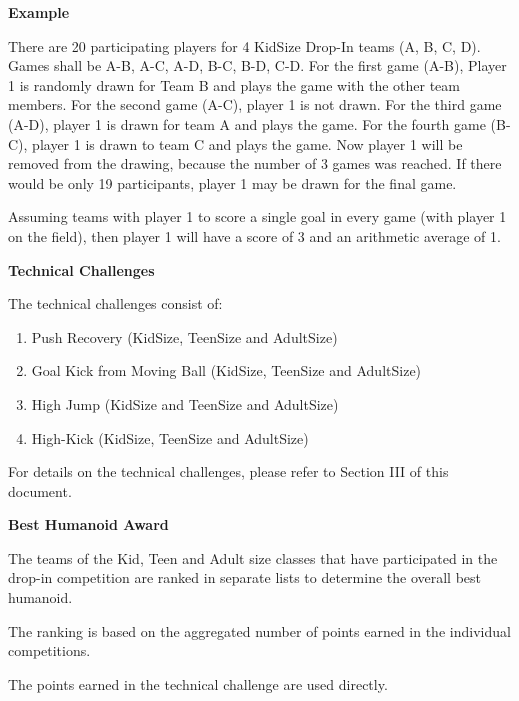 \bigskip 
 
{\bfseries Example}
 
There are 20 participating players for 4 KidSize Drop-In teams (A, B, C, D). Games shall be A-B, A-C, A-D, B-C, B-D, C-D. For the first game (A-B), Player 1 is randomly drawn for Team B and plays the game with the other team members. For the second game (A-C), player 1 is not drawn. For the third game (A-D), player 1 is drawn for team A and plays the game. For the fourth game (B-C), player 1 is drawn to team C and plays the game. Now player 1 will be removed from the drawing, because the number of 3 games was reached. If there would be only 19 participants, player 1 may be drawn for the final game.

Assuming teams with player 1 to score a single goal in every game (with player 1 on the field), then player 1 will have a score of 3 and an arithmetic average of 1.

\bigskip

{\bfseries Technical Challenges}

\headlinebox

The technical challenges consist of:

\begin{enumerate}
\item Push Recovery (KidSize, TeenSize and AdultSize)
\item Goal Kick from Moving Ball (KidSize, TeenSize and AdultSize)
\item High Jump (KidSize and TeenSize and AdultSize)
\item High-Kick (KidSize, TeenSize and AdultSize)
\end{enumerate}

For details on the technical challenges, please refer to Section III of this document.

\bigskip

\newpage
{\bfseries Best Humanoid Award}

\headlinebox
 
The teams of the Kid, Teen and Adult size classes that have participated in the drop-in competition are ranked in separate lists to determine the overall best humanoid.

The ranking is based on the aggregated number of points earned in the individual competitions.

\bigskip

The points earned in the technical challenge are used directly.

\bigskip

